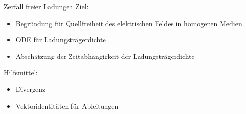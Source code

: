 \documentclass[fleqn,aspectratio=169]{beamer}
\begin{document}
\begin{frame}{Zerfall freier Ladungen}
Ziel:
\begin{itemize}
    \item Begründung für Quellfreiheit des elektrischen Feldes in homogenen Medien
    \item ODE für Ladungsträgerdichte
    \item Abschätzung der Zeitabhängigkeit der Ladungsträgerdichte
\end{itemize}
Hilfsmittel:
    \begin{itemize}
        \item Divergenz
        \item Vektoridentitäten für Ableitungen
    \end{itemize}

\end{frame}
\end{document}
